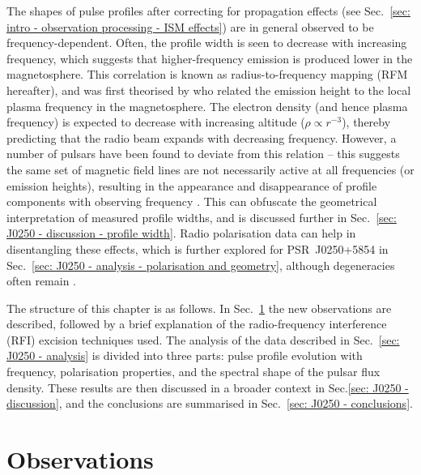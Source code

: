 The shapes of pulse profiles after correcting for propagation effects (see Sec.~\ref{sec: intro - observation processing - ISM effects}) are in general observed to be frequency-dependent. Often, the profile width is seen to decrease with increasing frequency, which suggests that higher-frequency emission is produced lower in the magnetosphere. This correlation is known as radius-to-frequency mapping (RFM hereafter), and was first theorised by \citet{RSxx1975} who related the emission height to the local plasma frequency in the magnetosphere. The electron density (and hence plasma frequency) is expected to decrease with increasing altitude ($\rho \propto r^{-3}$), thereby predicting that the radio beam expands with decreasing frequency. However, a number of pulsars have been found to deviate from this relation \citep[e.g.][]{Txxx1991, CWxx2014,PHS+2016} -- this suggests the same set of magnetic field lines are not necessarily active at all frequencies (or emission heights), resulting in the appearance and disappearance of profile components with observing frequency \citep[e.g.][]{Cxxx1978, MRxx2002}. This can obfuscate the geometrical interpretation of measured profile widths, and is discussed further in Sec.~\ref{sec: J0250 - discussion - profile width}. Radio polarisation data can help in disentangling these effects, which is further explored for PSR~J0250+5854 in Sec.~\ref{sec: J0250 - analysis - polarisation and geometry}, although degeneracies often remain \citep[e.g.][]{KJW+2010}.

The structure of this chapter is as follows. In Sec.~\ref{sec: J0250 - observations} the new observations are described, followed by a brief explanation of the radio-frequency interference (RFI) excision techniques used. The analysis of the data described in Sec.~\ref{sec: J0250 - analysis} is divided into three parts: pulse profile evolution with frequency, polarisation properties, and the spectral shape of the pulsar flux density. These results are then discussed in a broader context in Sec.\ref{sec: J0250 - discussion}, and the conclusions are summarised in Sec.~\ref{sec: J0250 - conclusions}.




















\section{Observations}
\label{sec: J0250 - observations}

